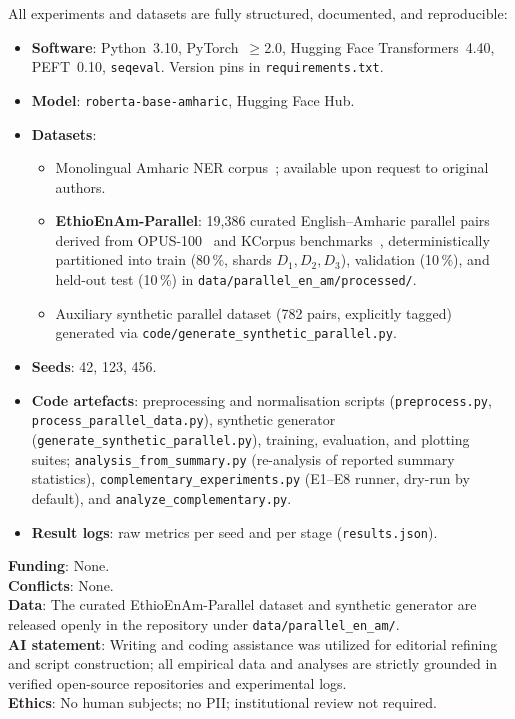 \documentclass[11pt,a4paper]{article}
\begin{document}
All experiments and datasets are fully structured, documented, and reproducible:
\begin{itemize}
  \item \textbf{Software}: Python~3.10, PyTorch~$\ge$2.0, Hugging Face
        Transformers~4.40, PEFT~0.10, \texttt{seqeval}.  Version pins
        in \texttt{requirements.txt}.
  \item \textbf{Model}: \texttt{roberta-base-amharic}, Hugging Face Hub.
  \item \textbf{Datasets}:
        \begin{itemize}
          \item Monolingual Amharic NER corpus~\cite{Yohannes2022};
                available upon request to original authors.
          \item \textbf{EthioEnAm-Parallel}: 19,386 curated English--Amharic
                parallel pairs derived from OPUS-100~\cite{Zhang2020OPUS100,Tiedemann2012}
                and KCorpus benchmarks~\cite{Alebachew2025}, deterministically
                partitioned into train (80\,\%, shards $D_1, D_2, D_3$),
                validation (10\,\%), and held-out test (10\,\%) in
                \nolinkurl{data/parallel_en_am/processed/}.
          \item Auxiliary synthetic parallel dataset (782 pairs, explicitly
                tagged) generated via \nolinkurl{code/generate_synthetic_parallel.py}.
        \end{itemize}
  \item \textbf{Seeds}: 42, 123, 456.
  \item \textbf{Code artefacts}: preprocessing and normalisation scripts
        (\nolinkurl{preprocess.py}, \nolinkurl{process_parallel_data.py}),
        synthetic generator (\nolinkurl{generate_synthetic_parallel.py}),
        training, evaluation, and plotting suites;
        \nolinkurl{analysis_from_summary.py} (re-analysis of reported
        summary statistics), \nolinkurl{complementary_experiments.py}
        (E1--E8 runner, dry-run by default), and
        \nolinkurl{analyze_complementary.py}.
  \item \textbf{Result logs}: raw metrics per seed and per stage
        (\texttt{results.json}).
\end{itemize}

\noindent\textbf{Funding}: None.\\
\textbf{Conflicts}: None.\\
\textbf{Data}: The curated EthioEnAm-Parallel dataset and synthetic generator
are released openly in the repository under \nolinkurl{data/parallel_en_am/}.\\
\textbf{AI statement}: Writing and coding assistance was utilized for
editorial refining and script construction; all empirical data and analyses
are strictly grounded in verified open-source repositories and experimental logs.\\
\textbf{Ethics}: No human subjects; no PII; institutional review not
required.
\end{document}
